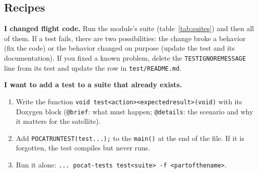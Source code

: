 \documentclass[11pt,a4paper]{article}
\DeclareRobustCommand{\_}{\textunderscore\allowbreak}
\newcommand{\cd}[1]{\texttt{#1}}
\begin{document}
\subsection{Recipes}

\textbf{I changed flight code.} Run the module's suite (table~\ref{tab:suites}) and
then all of them. If a test fails, there are two possibilities: the change broke a
behavior (fix the code) or the behavior changed on purpose (update the
test and its documentation). If you fixed a known problem, delete the
\cd{TEST\_IGNORE\_MESSAGE} line from its test and update the row in \cd{test/README.md}.

\textbf{I want to add a test to a suite that already exists.}
\begin{enumerate}
\item Write the function \cd{void test\_<action>\_<expected\_result>(void)} with its
  Doxygen block (\cd{@brief}: what must happen; \cd{@details}: the scenario and why it matters for the satellite).
\item Add \cd{POCAT\_RUN\_TEST(test\_...);} to the \cd{main()} at the end of the file. If it is
  forgotten, the test compiles but never runs.
\item Run it alone: \cd{... pocat-tests test\_<suite> -f <part\_of\_the\_name>}.
\end{enumerate}
\end{document}
